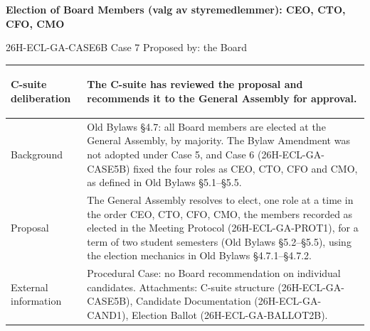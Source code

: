 \documentclass{../../../Common/Latex/Templates/rapport}
\begin{document}
\reportmainmatter
\small
\setlength{\parindent}{0pt}
\setlength{\tabcolsep}{6pt}
\renewcommand{\arraystretch}{1.2}

\begin{center}
  {\Large\bfseries Election of Board Members (valg av styremedlemmer): CEO, CTO, CFO, CMO}\par
  \vspace{0.15cm}
  {\normalsize 26H-ECL-GA-CASE6B \textperiodcentered{} Case 7 \textperiodcentered{} Proposed by: the Board}\par
  \vspace{0.1cm}
  {\small \meetingline}\par
\end{center}

\vspace{0.3cm}
\begin{tabularx}{\textwidth}{|>{\bfseries\raggedright\arraybackslash}p{4.2cm}|X|}
  \hline
  C-suite deliberation & The C-suite has reviewed the proposal and recommends it to the General Assembly for approval.                                                                                                                                                                                                       \\
  \hline
  Background           & Old Bylaws \S4.7: all Board members are elected at the General Assembly, by majority. The Bylaw Amendment was not adopted under Case 5, and Case 6 (26H-ECL-GA-CASE5B) fixed the four roles as CEO, CTO, CFO and CMO, as defined in Old Bylaws \S5.1--\S5.5.                                        \\
  \hline
  Proposal             & The General Assembly resolves to elect, one role at a time in the order CEO, CTO, CFO, CMO, the members recorded as elected in the Meeting Protocol (26H-ECL-GA-PROT1), for a term of two student semesters (Old Bylaws \S5.2--\S5.5), using the election mechanics in Old Bylaws \S4.7.1--\S4.7.2. \\
  \hline
  External information & Procedural Case: no Board recommendation on individual candidates. Attachments: C-suite structure (26H-ECL-GA-CASE5B), Candidate Documentation (26H-ECL-GA-CAND1), Election Ballot (26H-ECL-GA-BALLOT2B).                                                                                           \\
  \hline
\end{tabularx}
\end{document}
